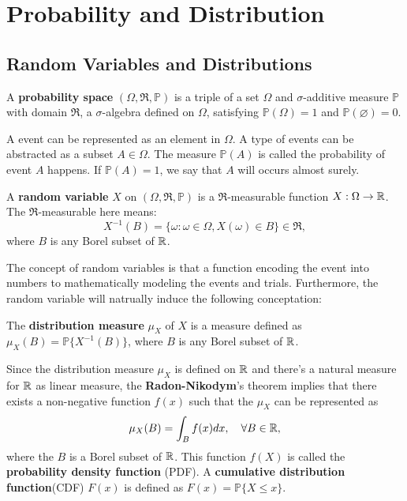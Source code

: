 
\section{Probability and Distribution}
\subsection{Random Variables and Distributions}
\begin{definition}
A \textbf{probability space} $(\Omega,\mathfrak{R},\mathbb{P})$ is a triple of a set $\Omega$ and $\sigma$-additive measure $\mathbb{P}$ with domain $\mathfrak{R}$, a $\sigma$-algebra defined on $\Omega$, satisfying $\mathbb{P}(\Omega) = 1$ and $\mathbb{P}(\varnothing)=0$.
\end{definition}
A event can be represented as an element in $\Omega$. A type of events can be abstracted as a subset $A\in\Omega$. The measure $\mathbb{P}(A)$ is called the probability of event $A$ happens. If $\mathbb{P}(A)=1$, we say that $A$ will occurs almost surely.

\begin{definition}
A \textbf{random variable} $X$ on $(\Omega,\mathfrak{R},\mathbb{P})$ is a $\mathfrak{R}$-measurable function $X:\Omega\to\mathbb{R}$. The $\mathfrak{R}$-measurable here means:
	\begin{equation}
		X^{-1}(B)=\{\omega:\omega\in\Omega, X(\omega)\in B\}\in\mathfrak{R},
	\end{equation}
where $B$ is any Borel subset of $\mathbb{R}$.
\end{definition}
The concept of random variables is that a function encoding the event into numbers to mathematically modeling the events and trials. Furthermore, the random variable will natrually induce the following conceptation:
\begin{definition}
The \textbf{distribution measure} $\mu_X$ of $X$ is a measure defined as $\mu_X(B)=\mathbb{P}\{X^{-1}(B)\}$, where $B$ is any Borel subset of $\mathbb{R}$.
\end{definition}
Since the distribution measure $\mu_X$ is defined on $\mathbb{R}$ and there's a natural measure for $\mathbb{R}$ as linear measure, the \textbf{Radon-Nikodym}'s theorem implies that there exists a non-negative function $f(x)$ such that the $\mu_X$ can be represented as
\begin{equation}
\mu_X(B) = \int_B f(x)d x, \quad\forall B\in\mathbb{R},
\end{equation} 
where the $B$ is a Borel subset of $\mathbb{R}$. This function $f(X)$ is called the \textbf{probability density function} (PDF). A \textbf{cumulative distribution function}(CDF) $F(x)$ is defined as $F(x)=\mathbb{P}\{X\le x\}$.

